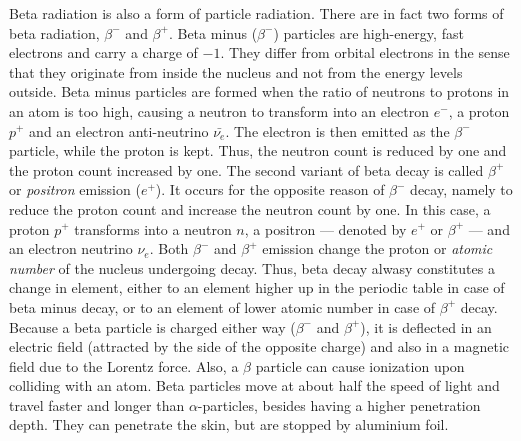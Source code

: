 
Beta radiation is also a form of particle radiation. There are in fact two forms of beta radiation, $\beta^-$ and $\beta^+$. Beta minus ($\beta^-$) particles are high-energy, fast electrons and carry a charge of $-1$. They differ from orbital electrons in the sense that they originate from inside the nucleus and not from the energy levels outside. Beta minus particles are formed when the ratio of neutrons to protons in an atom is too high, causing a neutron to transform into an electron $e^-$, a proton $p^+$ and an electron anti-neutrino $\bar{\nu_{e}}$. The electron is then emitted as the $\beta^-$ particle, while the proton is kept. Thus, the neutron count is reduced by one and the proton count increased by one. The second variant of beta decay is called $\beta^+$ or \emph{positron} emission ($e^+$). It occurs for the opposite reason of $\beta^-$ decay, namely to reduce the proton count and increase the neutron count by one. In this case, a proton $p^+$ transforms into a neutron $n$, a positron --- denoted by $e^+$ or $\beta^+$ --- and an electron neutrino $\nu_{e}$. Both $\beta^-$ and $\beta^+$ emission change the proton or \emph{atomic number} of the nucleus undergoing decay. Thus, beta decay alwasy constitutes a change in element, either to an element higher up in the periodic table in case of beta minus decay, or to an element of lower atomic number in case of $\beta^+$ decay. Because a beta particle is charged either way ($\beta^-$ and $\beta^+$), it is deflected in an electric field (attracted by the side of the opposite charge) and also in a magnetic field due to the Lorentz force. Also, a $\beta$ particle can cause ionization upon colliding with an atom. Beta particles move at about half the speed of light and travel faster and longer than $\alpha$-particles, besides having a higher penetration depth. They can penetrate the skin, but are stopped by aluminium foil.


